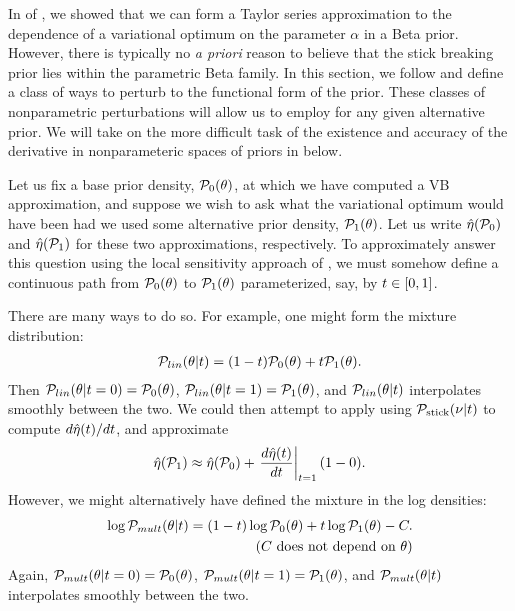 In  of , we showed that
we can form a Taylor series approximation to the dependence of a variational
optimum on the parameter $\alpha$ in a Beta prior. However, there is typically
no {\em a priori} reason to believe that the stick breaking prior lies within
the parametric Beta family.  In this section, we follow
\citet{gustafson:1996:local} and define a class of ways to perturb to the
functional form of the prior.  These classes of nonparametric perturbations will
allow us to employ  for any given alternative  prior.  We
will take on the more difficult task of the existence and accuracy of the
derivative in nonparameteric spaces of priors in  below.

Let us fix a base prior density, $\mathcal{P}_{0}(\theta)$, at which we have computed a
VB approximation, and suppose we wish to ask what the variational optimum would
have been had we used some alternative prior density, $\mathcal{P}_{1}(\theta)$.  Let us
write $\hat\eta(\mathcal{P}_{0})$ and $\hat\eta(\mathcal{P}_{1})$ for these two approximations,
respectively.  To approximately answer this question using the local sensitivity
approach of , we must somehow define a continuous path
from $\mathcal{P}_{0}(\theta)$ to $\mathcal{P}_{1}(\theta)$ parameterized, say, by $t \in [0, 1]$.

There are many ways to do so.  For example, one might form the mixture
distribution:
%
\begin{align*}
%
\p_{lin}(\theta \vert \t) =
    (1- \t) \pbase(\theta) + \t \palt(\theta).
%
\end{align*}
%
Then $\mathcal{P}_{lin}(\theta \vert t=0) = \mathcal{P}_{0}(\theta)$, $\mathcal{P}_{lin}(\theta \vert t=1) =
\mathcal{P}_{1}(\theta)$, and $\mathcal{P}_{lin}(\theta \vert t)$ interpolates smoothly between the
two.  We could then attempt to apply  using $\mathcal{P}_{\mathrm{stick}}(\nu \vert
t)$ to compute $d\hat\eta(t) / dt$, and approximate
%
\begin{align*}
%
\etaopt(\palt) \approx \etaopt(\pbase) + \fracat{d \etaopt(\t)}{d\t}{\t=1}(1 - 0).
%
\end{align*}
%
However, we might alternatively have defined the mixture in the log densities:
%
\begin{align*}
%
\log \p_{mult}(\theta \vert \t) =
    (1- \t) \log\pbase(\theta) + \t \log\palt(\theta) -
    \const. \\ \constdesc{\theta}
%
\end{align*}
%
Again, $\mathcal{P}_{mult}(\theta \vert t=0) = \mathcal{P}_{0}(\theta)$, $\mathcal{P}_{mult}(\theta \vert
t=1) = \mathcal{P}_{1}(\theta)$, and $\mathcal{P}_{mult}(\theta \vert t)$ interpolates smoothly
between the two.

